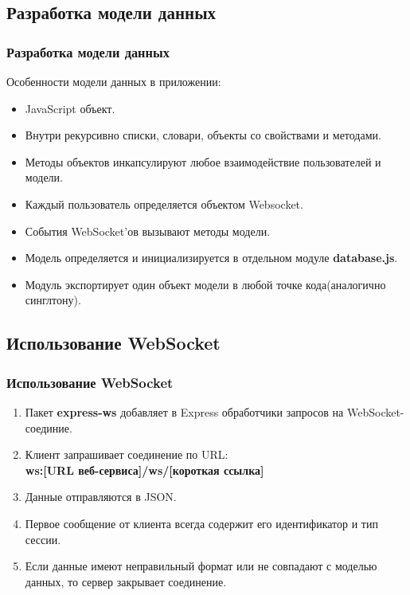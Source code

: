 \documentclass{beamer}
\begin{document}
\subsection{Разработка модели данных}
\begin{frame}
\frametitle{Разработка модели данных}
	Особенности модели данных в приложении:
	\begin{itemize}
		\item JavaScript объект.
		\item Внутри рекурсивно списки, словари, объекты со свойствами и методами.
		\item Методы объектов инкапсулируют любое взаимодействие пользователей и модели.
		\item Каждый пользователь определяется объектом Websocket.
		\item События WebSocket'ов вызывают методы модели. 
		\item Модель определяется и инициализируется в отдельном модуле \textbf{database.js}.
		\item Модуль экспортирует один объект модели в любой точке кода(аналогично синглтону).
	\end{itemize}
\end{frame}





\subsection{Использование WebSocket}
\begin{frame}
\frametitle{Использование WebSocket}
	\begin{enumerate}
		\item Пакет \textbf{express-ws} добавляет в Express обработчики запросов на WebSocket-соединие.
		\item Клиент запрашивает соединение по URL:\\ \textbf{ws:[URL веб-сервиса]/ws/[короткая ссылка]}	  
		\item Данные отправляются в JSON. 
		\item Первое сообщение от клиента всегда содержит его идентификатор и тип сессии. 
		\item Если данные имеют неправильный формат или не совпадают с моделью данных, то сервер закрывает соединение.
	\end{enumerate}
\end{frame}
\end{document}
